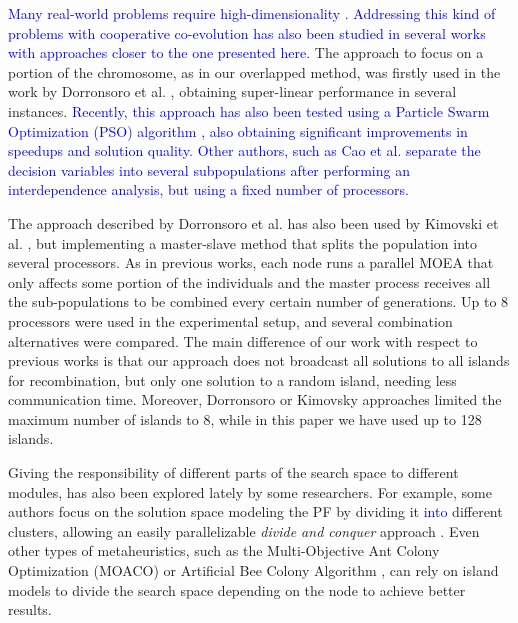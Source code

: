 \documentclass[preprint]{elsarticle}
\begin{document}
\textcolor{blue}{Many real-world problems require high-dimensionality \cite{Zhang17DECAL,XU2018268}.
Addressing this kind of problems with cooperative co-evolution has
also been studied in several works with approaches closer to the one
presented here.} The approach to focus on a portion of the chromosome,
as in our overlapped method, was firstly used in the work by
Dorronsoro et al. \citep{Dorronsoro13superlinear}, obtaining
super-linear performance 
in several instances. \textcolor{blue}{Recently, this approach has also been tested using a Particle Swarm Optimization (PSO) algorithm \cite{DorronsoroPSO2018}, also obtaining significant improvements in speedups and solution quality. \textcolor{blue}{Other} authors, such as Cao et al. \cite{CaoZLL17} separate the decision variables into several subpopulations after performing an interdependence analysis, but using a fixed number of processors.}

The approach described by Dorronsoro et al. has also been used by Kimovski et al. \citep{Kimovski15Parallel}, but implementing a
master-slave method that splits the population into several processors. As in previous works, each node
runs a parallel MOEA that only affects some portion of 
the individuals and the master
process receives all the sub-populations to be combined every certain number of generations. Up to 8 processors
were used in the experimental setup, and several
combination alternatives were compared. The main difference of our work with respect to previous works is that our approach does not 
broadcast all solutions to all islands for recombination, but only one solution to a random island, needing less
communication time. Moreover, Dorronsoro or Kimovsky approaches limited the maximum number of islands to 8, while in this paper we have
used up to 128 islands. 

Giving the responsibility of different parts of the search space to
different modules, has also been explored lately by some
researchers. For example, some authors focus on the solution space
modeling the PF by dividing it \textcolor{blue}{into} different clusters, allowing an
easily parallelizable {\em divide and conquer} approach
\citep{cheng2015adaptive}. 
Even other types of metaheuristics, 
such as the Multi-Objective Ant Colony Optimization (MOACO) \cite{Mora13paretobased}
or Artificial Bee Colony Algorithm \cite{LUO2017235}, 
can rely on island models to divide the search space depending on 
the node to achieve better results.
\end{document}
